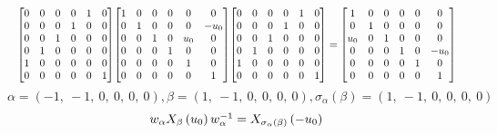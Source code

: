 \documentclass[11pt]{article}
\theoremstyle{definition}
\begin{document}
\[
\scaletoalign{\textwidth}{{\left[\begin{matrix}0 & 0 & 0 & 0 & 1 & 0\\0 & 0 & 0 & 1 & 0 & 0\\0 & 0 & 1 & 0 & 0 & 0\\0 & 1 & 0 & 0 & 0 & 0\\1 & 0 & 0 & 0 & 0 & 0\\0 & 0 & 0 & 0 & 0 & 1\end{matrix}\right]} {\left[\begin{matrix}1 & 0 & 0 & 0 & 0 & 0\\0 & 1 & 0 & 0 & 0 & - u_{0}\\0 & 0 & 1 & 0 & u_{0} & 0\\0 & 0 & 0 & 1 & 0 & 0\\0 & 0 & 0 & 0 & 1 & 0\\0 & 0 & 0 & 0 & 0 & 1\end{matrix}\right]} {\left[\begin{matrix}0 & 0 & 0 & 0 & 1 & 0\\0 & 0 & 0 & 1 & 0 & 0\\0 & 0 & 1 & 0 & 0 & 0\\0 & 1 & 0 & 0 & 0 & 0\\1 & 0 & 0 & 0 & 0 & 0\\0 & 0 & 0 & 0 & 0 & 1\end{matrix}\right]} = {\left[\begin{matrix}1 & 0 & 0 & 0 & 0 & 0\\0 & 1 & 0 & 0 & 0 & 0\\u_{0} & 0 & 1 & 0 & 0 & 0\\0 & 0 & 0 & 1 & 0 & - u_{0}\\0 & 0 & 0 & 0 & 1 & 0\\0 & 0 & 0 & 0 & 0 & 1\end{matrix}\right]}}
\]
\[
\alpha = \left( -1, \  -1, \  0, \  0, \  0, \  0\right), \beta = \left( 1, \  -1, \  0, \  0, \  0, \  0\right), \sigma_{\alpha}(\beta) = \left( 1, \  -1, \  0, \  0, \  0, \  0\right)
\]
\[
\scaletoalign{\textwidth}{w_{\alpha} X_{\beta}\left(u_{0}\right) w_{\alpha}^{-1} = X_{\sigma_{\alpha}\left(\beta\right)}\left(- u_{0}\right)}
\]
\end{document}
